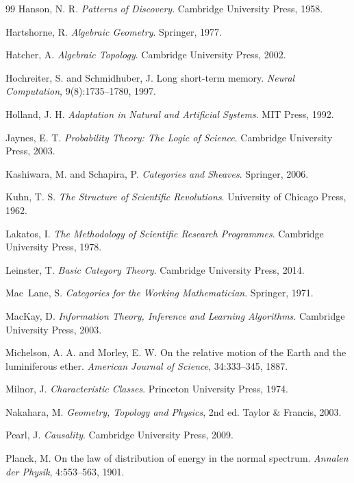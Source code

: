 \documentclass[12pt,oneside]{book}
\theoremstyle{plain}
\theoremstyle{definition}
\theoremstyle{remark}
\newcommand{\1}{\mathbf{1}}
\begin{document}
\begin{thebibliography}{99}
Hanson, N. R.
\textit{Patterns of Discovery}.
Cambridge University Press, 1958.

Hartshorne, R.
\textit{Algebraic Geometry}.
Springer, 1977.

Hatcher, A.
\textit{Algebraic Topology}.
Cambridge University Press, 2002.

Hochreiter, S. and Schmidhuber, J.
Long short-term memory.
\textit{Neural Computation}, 9(8):1735--1780, 1997.

Holland, J. H.
\textit{Adaptation in Natural and Artificial Systems}.
MIT Press, 1992.

Jaynes, E. T.
\textit{Probability Theory: The Logic of Science}.
Cambridge University Press, 2003.

Kashiwara, M. and Schapira, P.
\textit{Categories and Sheaves}.
Springer, 2006.

Kuhn, T. S.
\textit{The Structure of Scientific Revolutions}.
University of Chicago Press, 1962.

Lakatos, I.
\textit{The Methodology of Scientific Research Programmes}.
Cambridge University Press, 1978.

Leinster, T.
\textit{Basic Category Theory}.
Cambridge University Press, 2014.

Mac~Lane, S.
\textit{Categories for the Working Mathematician}.
Springer, 1971.

MacKay, D.
\textit{Information Theory, Inference and Learning Algorithms}.
Cambridge University Press, 2003.

Michelson, A. A. and Morley, E. W.
On the relative motion of the Earth and the luminiferous ether.
\textit{American Journal of Science}, 34:333--345, 1887.

Milnor, J.
\textit{Characteristic Classes}.
Princeton University Press, 1974.

Nakahara, M.
\textit{Geometry, Topology and Physics}, 2nd ed.
Taylor \& Francis, 2003.

Pearl, J.
\textit{Causality}.
Cambridge University Press, 2009.

Planck, M.
On the law of distribution of energy in the normal spectrum.
\textit{Annalen der Physik}, 4:553--563, 1901.


\end{thebibliography}
\end{document}

